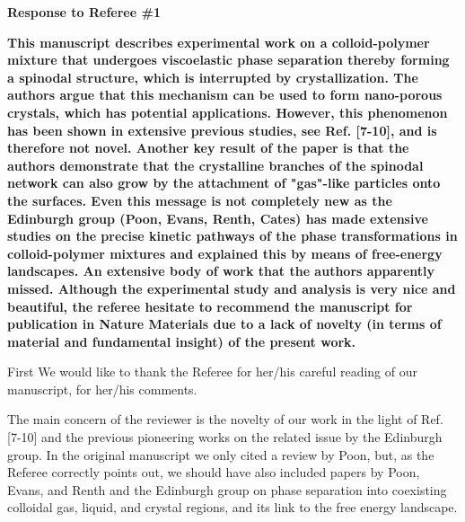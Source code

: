 \documentclass[11pt]{article}
\begin{document}
\clearpage

\noindent
\begin{Large}
{\bf Response to Referee \#1}
\end{Large}

\vspace{1em}

\singlespacing

{\bf
This manuscript describes experimental work on a colloid-polymer mixture that undergoes viscoelastic phase separation thereby forming a spinodal structure, which is interrupted by crystallization. The authors argue that this mechanism can be used to form nano-porous crystals, which has potential applications. However, this phenomenon has been shown in extensive previous studies, see Ref. [7-10], and is therefore not novel. Another key result of the paper is that the authors demonstrate that the crystalline branches of the spinodal network can also grow by the attachment of "gas"-like particles onto the surfaces. Even this message is not completely new as the Edinburgh group (Poon, Evans, Renth, Cates) has made extensive studies on the precise kinetic pathways of the phase transformations in colloid-polymer mixtures and explained this by means of free-energy landscapes. An extensive body of work that the authors apparently missed. Although the experimental study and analysis is very nice and beautiful, the 
referee hesitate to recommend the manuscript for publication in Nature Materials due to a lack of novelty (in terms of material and fundamental insight) of the present work.
}


\bigskip
\doublespacing

First We would like to thank the Referee for her/his careful reading of our manuscript, for her/his comments. 

The main concern of the reviewer is the novelty of our work in the light of Ref. [7-10] and the previous pioneering works on the related issue by the Edinburgh group. In the original manuscript we only cited a review by Poon, but, as the Referee correctly points out, we should have
also included papers by Poon, Evans, and Renth and the Edinburgh group on phase separation into coexisting colloidal gas, liquid, and crystal regions, and its link to the free energy landscape.
\end{document}
